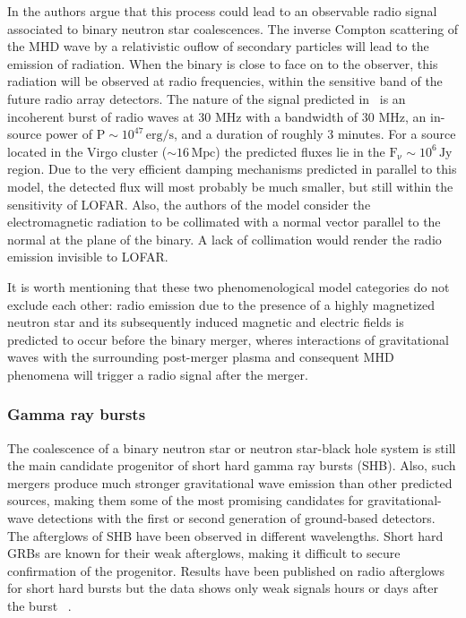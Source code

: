 \documentclass[epsf]{article}
\begin{document}
In \cite{Moortgat:2005fs,Moortgat:2004xz} the authors argue that
this process could lead to an observable radio signal associated to
binary neutron star coalescences.  The inverse Compton scattering of
the MHD wave by a relativistic ouflow of secondary particles will
lead to the emission of radiation.  When the binary is close to face
 on to the observer, this radiation will be observed at radio
 frequencies, within the sensitive band of the future radio array detectors.
 The nature of the signal predicted in~\cite{Moortgat:2005fs} is an
 incoherent burst of radio waves at 30 MHz with a bandwidth
 of 30 MHz, an in-source power of $\mathrm{P} \sim 10^{47}\,\mathrm{erg/s}$,
 and a duration of roughly 3 minutes. For a source located
 in the Virgo cluster ($\sim 16\,\mathrm{Mpc}$) the predicted fluxes lie in the
 $\mathrm{F_{\nu}} \sim 10^6 \,\mathrm{Jy}$ region.
 Due to the very efficient damping mechanisms predicted in parallel to this
 model, the detected flux will most probably be much smaller, but
 still within the sensitivity of LOFAR. Also, the authors of the model
 consider the electromagnetic radiation to be collimated with a normal
 vector parallel to the normal at the plane of the binary. A lack of
 collimation would render the radio emission invisible to LOFAR.

It is worth mentioning that these two phenomenological model categories do not exclude each other: radio emission due to the presence of a highly magnetized neutron star and its subsequently induced magnetic and electric fields is predicted to occur before the binary merger, wheres interactions of gravitational waves with the surrounding post-merger plasma and consequent MHD phenomena will trigger a radio signal after the merger. 


\subsubsection{Gamma ray bursts}

The coalescence of a binary neutron star or neutron star-black hole system
is still the main candidate progenitor of short hard gamma ray bursts (SHB).  Also, such mergers produce much stronger gravitational wave
emission than other predicted sources, making them some of the most promising candidates for gravitational-wave
detections with the first or second generation of ground-based detectors. The afterglows of SHB have been observed in different wavelengths.   
Short hard GRBs are known for their weak afterglows, making it difficult to secure confirmation of the
progenitor. Results have been published on radio afterglows for short hard bursts but
the data shows only weak signals hours or days after the burst ~\cite{Ofek:2006pr,Soderberg:2006bn}.  
\end{document}
